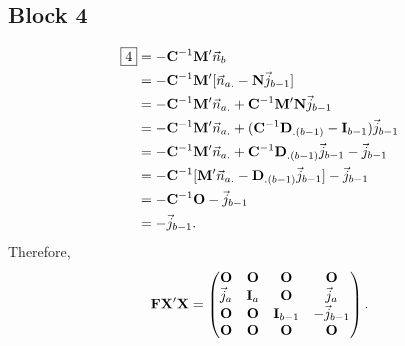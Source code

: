 \subsection*{Block 4}
\begin{align*}
    \boxed{4}
     & =-\mathbf{C}^{-1}\mathbf{M}'\vec{n}_{b}                                                                        \\
     & =-\mathbf{C}^{-1}\mathbf{M}'[\vec{n}_{a.}-\mathbf{N}\vec{j}_{b-1}]                                          \\
     & =-\mathbf{C}^{-1}\mathbf{M}'\vec{n}_{a.}+\mathbf{C}^{-1}\mathbf{M}'\mathbf{N}\vec{j}_{b-1}                  \\
     & =-\mathbf{C}^{-1}\mathbf{M}'\vec{n}_{a.}+(\mathbf{C}^{-1}\mathbf{D}_{.(b-1)}-\mathbf{I}_{b-1})\vec{j}_{b-1} \\
     & =-\mathbf{C}^{-1}\mathbf{M}'\vec{n}_{a.}+\mathbf{C}^{-1}\mathbf{D}_{.(b-1)}\vec{j}_{b-1}-\vec{j}_{b-1}   \\
     & =-\mathbf{C}^{-1}[\mathbf{M}'\vec{n}_{a.}-\mathbf{D}_{.(b-1)}\vec{j}_{b-1}]-\vec{j}_{b-1}                \\
     & =-\mathbf{C}^{-1}\mathbf{O}-\vec{j}_{b-1}                                                                      \\
     & =-\vec{j}_{b-1}.
\end{align*}
Therefore,
\[ \mathbf{F}\mathbf{X}'\mathbf{X}
    =\begin{pmatrix}
        \mathbf{O}   & \mathbf{O}   & \mathbf{O}       & \mathbf{O}        \\
        \vec{j}_a & \mathbf{I}_a & \mathbf{O}       & \vec{j}_a      \\
        \mathbf{O}   & \mathbf{O}   & \mathbf{I}_{b-1} & -\vec{j}_{b-1} \\
        \mathbf{O}   & \mathbf{O}   & \mathbf{O}       & \mathbf{O}
    \end{pmatrix}. \]
